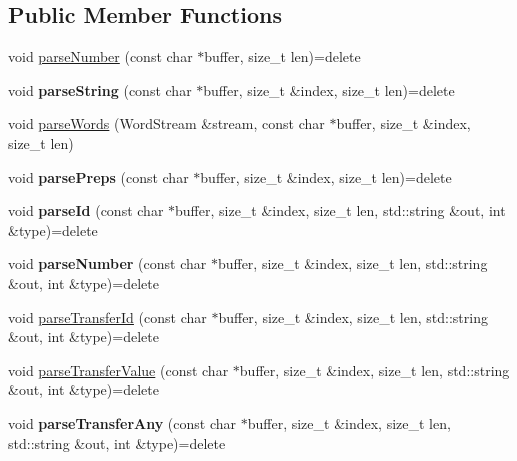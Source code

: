 \subsection*{Public Member Functions}
\begin{DoxyCompactItemize}
\item 
void \hyperlink{class_lexical_parser_a6cd877627322dd31c6a46273fc9b6894}{parse\+Number} (const char $\ast$buffer, size\+\_\+t len)=delete
\item 
\mbox{\label{class_lexical_parser_a7d93f76bc1eec8af4813121315b34c87}} 
void {\bfseries parse\+String} (const char $\ast$buffer, size\+\_\+t \&index, size\+\_\+t len)=delete
\item 
void \hyperlink{class_lexical_parser_a77d61f1f606f174e2006c931113417d1}{parse\+Words} (Word\+Stream \&stream, const char $\ast$buffer, size\+\_\+t \&index, size\+\_\+t len)
\item 
\mbox{\label{class_lexical_parser_a1a25b55b47c23b685c54dd14b46425ab}} 
void {\bfseries parse\+Preps} (const char $\ast$buffer, size\+\_\+t \&index, size\+\_\+t len)=delete
\item 
\mbox{\label{class_lexical_parser_a8d501de0f79eb98993bed6cc8653e250}} 
void {\bfseries parse\+Id} (const char $\ast$buffer, size\+\_\+t \&index, size\+\_\+t len, std\+::string \&out, int \&type)=delete
\item 
\mbox{\label{class_lexical_parser_a9ee4628a8d8dbd1beb0be32ddb895a28}} 
void {\bfseries parse\+Number} (const char $\ast$buffer, size\+\_\+t \&index, size\+\_\+t len, std\+::string \&out, int \&type)=delete
\item 
void \hyperlink{class_lexical_parser_a6df790a89ab25c5d64cf28c6ac22d011}{parse\+Transfer\+Id} (const char $\ast$buffer, size\+\_\+t \&index, size\+\_\+t len, std\+::string \&out, int \&type)=delete
\item 
void \hyperlink{class_lexical_parser_a958596ee7745fcd38d83ee81b1f96234}{parse\+Transfer\+Value} (const char $\ast$buffer, size\+\_\+t \&index, size\+\_\+t len, std\+::string \&out, int \&type)=delete
\item 
\mbox{\label{class_lexical_parser_a3d0abc8c213c8ed2cc0ed13ba31bab8c}} 
void {\bfseries parse\+Transfer\+Any} (const char $\ast$buffer, size\+\_\+t \&index, size\+\_\+t len, std\+::string \&out, int \&type)=delete

\end{DoxyCompactItemize}
